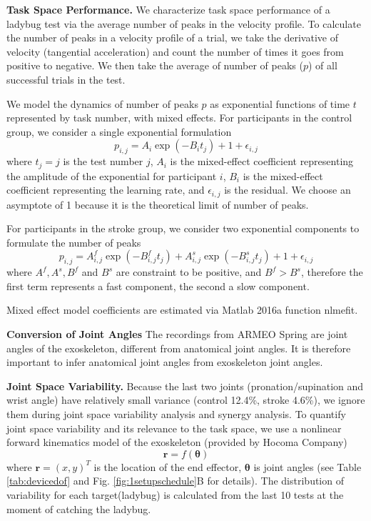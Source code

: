 \textbf{Task Space Performance.}
We characterize task space performance of a ladybug test via the average number of peaks in the velocity profile.%
To calculate the number of peaks in a velocity profile of a trial, we take the derivative of velocity (tangential acceleration) and count the number of times it goes from positive to negative.
We then take the average of number of peaks ($ p $) of all successful trials in the test.

We model the dynamics of number of peaks $ p $ as exponential functions of time $ t $ represented by task number, with mixed effects.
For participants in the control group, we consider a single exponential formulation
\begin{equation}\label{eqn:singleexp}
p_{i,j} = A_i \exp(-B_i t_{j}) + 1 + \epsilon_{i,j}
\end{equation}
where $ t_{j} = j $ is the test number $ j $, 
$ A_i $ is the mixed-effect coefficient representing the amplitude of the exponential for participant $ i $,
$ B_i $ is the mixed-effect coefficient representing the learning rate,
and $ \epsilon_{i,j} $ is the residual. 
We choose an asymptote of 1 because it is the theoretical limit of number of peaks.

For participants in the stroke group, we consider two exponential components to formulate the number of peaks
\begin{equation}\label{eqn:doubleexp}
p_{i,j} = A^f_{i,j} \exp(-B^f_{i,j} t_j) + A^s_{i,j} \exp(-B^s_{i,j} t_j) + 1 + \epsilon_{i,j}
\end{equation}
where $ A^f, A^s, B^f $ and $ B^s $ are constraint to be positive, and $ B^f > B^s $, therefore the first term represents a fast component, the second a slow component.

Mixed effect model coefficients are estimated via Matlab 2016a function \textsf{nlmefit}.

\textbf{Conversion of Joint Angles}
The recordings from ARMEO Spring are joint angles of the exoskeleton, different from anatomical joint angles.
It is therefore important to infer anatomical joint angles from exoskeleton joint angles. 

\textbf{Joint Space Variability.}
Because the last two joints (pronation/supination and wrist angle) have relatively small variance (control 12.4\%, stroke 4.6\%), we ignore them during joint space variability analysis and synergy analysis.
To quantify joint space variability and its relevance to the task space, we use a nonlinear forward kinematics model of the exoskeleton (provided by Hocoma Company)
	\begin{equation}\label{eqn:nonlinearForwardKinematics}
	\bm{r} = f(\bm{\theta})
	\end{equation}
where $ \bm{r} = (x,y)^T $ is the location of the end effector, $ \bm{\theta} $ is joint angles (see Table \ref{tab:devicedof} and Fig. \ref{fig:1setupschedule}B for details). 
The distribution of variability for each target(ladybug) is calculated from the last 10 tests at the moment of catching the ladybug. 

